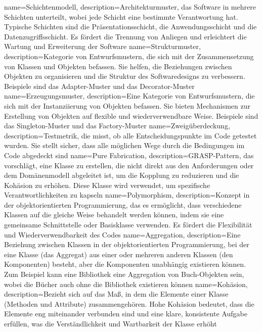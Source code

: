 {
    name={Schichtenmodell},
    description={Architekturmuster, das Software in mehrere Schichten unterteilt, wobei jede Schicht eine bestimmte Verantwortung hat. Typische Schichten sind die Präsentationsschicht, die Anwendungsschicht und die Datenzugriffsschicht. Es fördert die Trennung von Anliegen und erleichtert die Wartung und Erweiterung der Software}
}
{
    name={Strukturmuster},
    description={Kategorie von Entwurfsmustern, die sich mit der Zusammensetzung von Klassen und Objekten befassen. Sie helfen, die Beziehungen zwischen Objekten zu organisieren und die Struktur des Softwaredesigns zu verbessern. Beispiele sind das Adapter-Muster und das Decorator-Muster}
}
{
    name={Erzeugungsmuster},
    description={Eine Kategorie von Entwurfsmustern, die sich mit der Instanziierung von Objekten befassen. Sie bieten Mechanismen zur Erstellung von Objekten auf flexible und wiederverwendbare Weise. Beispiele sind das Singleton-Muster und das Factory-Muster}
}
{
    name={Zweigüberdeckung},
    description={Testmetrik, die misst, ob alle Entscheidungspunkte im Code getestet wurden. Sie stellt sicher, dass alle möglichen Wege durch die Bedingungen im Code abgedeckt sind}
}
{
    name={Pure Fabrication},
    description={GRASP-Pattern, das vorschlägt, eine Klasse zu erstellen, die nicht direkt aus den Anforderungen oder dem Domänenmodell abgeleitet ist, um die Kopplung zu reduzieren und die Kohäsion zu erhöhen. Diese Klasse wird verwendet, um spezifische Verantwortlichkeiten zu kapseln}
}
{
    name={Polymorphism},
    description={Konzept in der objektorientierten Programmierung, das es ermöglicht, dass verschiedene Klassen auf die gleiche Weise behandelt werden können, indem sie eine gemeinsame Schnittstelle oder Basisklasse verwenden. Es fördert die Flexibilität und Wiederverwendbarkeit des Codes}
}
{
    name={Aggregation},
    description={Eine Beziehung zwischen Klassen in der objektorientierten Programmierung, bei der eine Klasse (das Aggregat) aus einer oder mehreren anderen Klassen (den Komponenten) besteht, aber die Komponenten unabhängig existieren können. Zum Beispiel kann eine Bibliothek eine Aggregation von Buch-Objekten sein, wobei die Bücher auch ohne die Bibliothek existieren können}
}
{
    name={Kohäsion},
    description={Bezieht sich auf das Maß, in dem die Elemente einer Klasse (Methoden und Attribute) zusammengehören. Hohe Kohäsion bedeutet, dass die Elemente eng miteinander verbunden sind und eine klare, konsistente Aufgabe erfüllen, was die Verständlichkeit und Wartbarkeit der Klasse erhöht}
}
